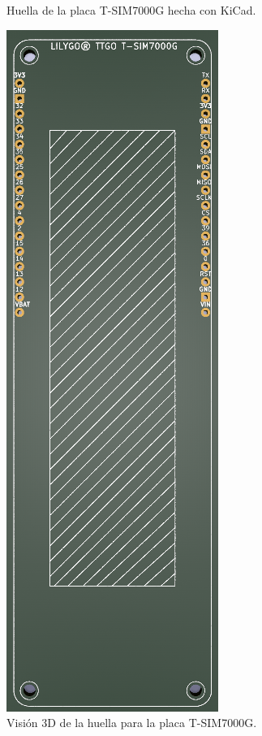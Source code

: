 \begin{figure}[H]
\begin{minipage}{.4\linewidth}
    \caption{Huella de la placa T-SIM7000G hecha con KiCad.}
    \label{fig:tsim-footprint}
  \end{minipage}
  \hfill
  \begin{minipage}{.4\linewidth}
    \includegraphics[width=\linewidth]{images/TSIM7000G-3D.png}
    \caption{Visión 3D de la huella para la placa T-SIM7000G.}
    \label{fig:tsim-3d}
  \end{minipage}
\end{figure}

